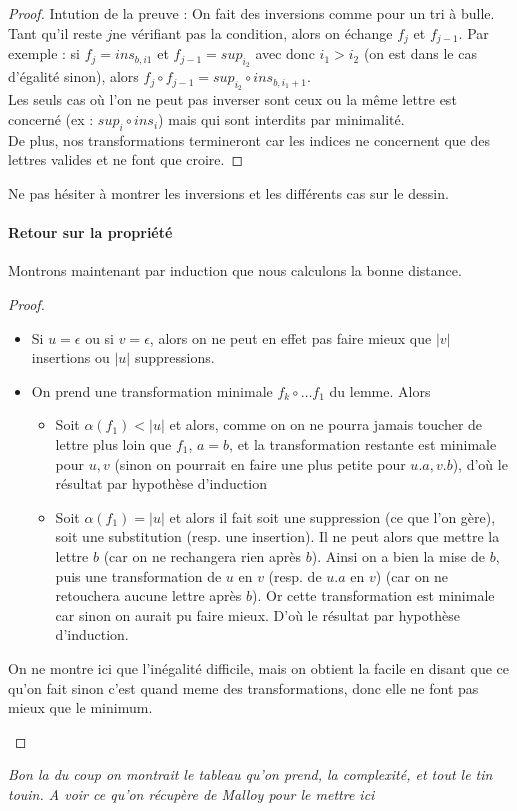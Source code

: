 \begin{proof}
	Intution de la preuve : On fait des inversions comme pour un tri à bulle.\\
	
	Tant qu'il reste $j$ne vérifiant pas la condition, alors on échange $f_j$ et $f_{j-1}$. Par exemple : si $f_j = ins_{b, i1}$ et $f_{j-1} = sup_{i_2}$ avec donc $i_1 > i_2$ (on est dans le cas d'égalité sinon), alors $f_j \circ f_{j-1} = sup_{i_2} \circ ins_{b, i_1+1}$.\\
	Les seuls cas où l'on ne peut pas inverser sont ceux ou la même lettre est concerné (ex : $sup_i \circ ins_i$) mais qui sont interdits par minimalité.\\
	De plus, nos transformations termineront car les indices ne concernent que des lettres valides et ne font que croire.
\end{proof}

\begin{com}
	Ne pas hésiter à montrer les inversions et les différents cas sur le dessin.
\end{com}


\paragraph{Retour sur la propriété} Montrons maintenant par induction que nous calculons la bonne distance. \\
\begin{proof}
	\begin{itemize}[label = $\star$]
		\item Si $u = \epsilon$ ou si $v = \epsilon$, alors on ne peut en effet pas faire mieux que $|v|$ insertions ou $|u|$ suppressions.
		\item On prend une transformation minimale $f_k \circ \dots f_1$ du lemme. Alors \begin{itemize}[label = $\bullet$]
			\item Soit $\alpha(f_1) < |u|$ et alors, comme on on ne pourra jamais toucher de lettre plus loin que $f_1$, $a = b$, et la transformation restante est minimale pour $u, v$ (sinon on pourrait en faire une plus petite pour $u.a, v.b$), d'où le résultat par hypothèse d'induction 
			\item Soit $\alpha(f_1) = |u|$ et alors il fait soit une suppression (ce que l'on gère), soit une substitution (resp. une insertion). Il ne peut alors que mettre la lettre $b$ (car on ne rechangera rien après $b$). Ainsi on a bien la mise de $b$, puis une transformation de $u$ en $v$ (resp. de $u.a$ en $v$) (car on ne retouchera aucune lettre après $b$). Or cette transformation est minimale car sinon on aurait pu faire mieux. D'où le résultat par hypothèse d'induction.
		\end{itemize}
	\end{itemize}
	\begin{com}
		On ne montre ici que l'inégalité difficile, mais on obtient la facile en disant que ce qu'on fait sinon c'est quand meme des transformations, donc elle ne font pas mieux que le minimum.
	\end{com}

\end{proof}

\textit{Bon la du coup on montrait le tableau qu'on prend, la complexité, et tout le tin touin. A voir ce qu'on récupère de Malloy pour le mettre ici}